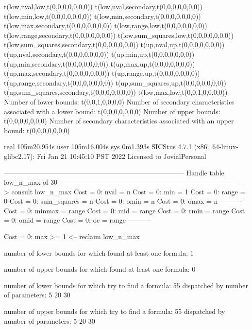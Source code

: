 t(low,nval,low,t(0,0,0,0,0,0,0))
t(low,nval,secondary,t(0,0,0,0,0,0,0))
t(low,min,low,t(0,0,0,0,0,0,0))
t(low,min,secondary,t(0,0,0,0,0,0,0))
t(low,max,secondary,t(0,0,0,0,0,0,0))
t(low,range,low,t(0,0,0,0,0,0,0))
t(low,range,secondary,t(0,0,0,0,0,0,0))
t(low,sum_squares,low,t(0,0,0,0,0,0,0))
t(low,sum_squares,secondary,t(0,0,0,0,0,0,0))
t(up,nval,up,t(0,0,0,0,0,0,0))
t(up,nval,secondary,t(0,0,0,0,0,0,0))
t(up,min,up,t(0,0,0,0,0,0,0))
t(up,min,secondary,t(0,0,0,0,0,0,0))
t(up,max,up,t(0,0,0,0,0,0,0))
t(up,max,secondary,t(0,0,0,0,0,0,0))
t(up,range,up,t(0,0,0,0,0,0,0))
t(up,range,secondary,t(0,0,0,0,0,0,0))
t(up,sum_squares,up,t(0,0,0,0,0,0,0))
t(up,sum_squares,secondary,t(0,0,0,0,0,0,0))
t(low,max,low,t(0,0,1,0,0,0,0))
Number of lower bounds:                                             t(0,0,1,0,0,0,0)
Number of secondary characteristics associated with a lower bound:  t(0,0,0,0,0,0,0)
Number of upper bounds:                                             t(0,0,0,0,0,0,0)
Number of secondary characteristics associated with an upper bound: t(0,0,0,0,0,0,0)

real	105m20.954s
user	105m16.004s
sys	0m1.393s
SICStus 4.7.1 (x86_64-linux-glibc2.17): Fri Jan 21 10:45:10 PST 2022
Licensed to JovialPersonal


--------------------------------------------------------------------------------
Handle table low_n_max of 30
--------------------------------------------------------------------------------
--> consult low_n_max
Cost =  0:  nval        = n
Cost =  0:  min         = 1
Cost =  0:  range       = 0
Cost =  0:  sum_squares = n
Cost =  0:  omin        = n
Cost =  0:  omax        = n
----------
Cost =  0:  minmax      = range
Cost =  0:  mid         = range
Cost =  0:  rmin        = range
Cost =  0:  omid        = range
Cost =  0:  oc          = range
----------

Cost =  0:  max >= 1
<-- reclaim low_n_max

number of lower bounds for which found at least one formula: 1

number of upper bounds for which found at least one formula: 0

number of lower bounds for which try to find a formula: 55
dispatched by number of parameters: 5  20  30

number of upper bounds for which try to find a formula: 55
dispatched by number of parameters: 5  20  30

